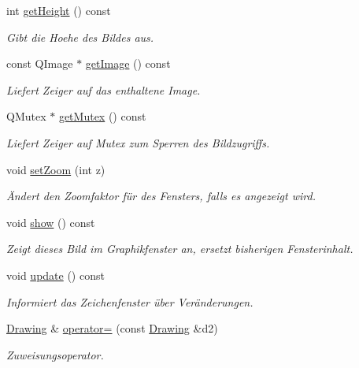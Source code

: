 \begin{DoxyCompactItemize}
int \mbox{\hyperlink{classDrawing_a7bd4dcf4718cf46a73d11e63dc7bc876}{get\+Height}} () const
\begin{DoxyCompactList}\small\item\em Gibt die Hoehe des Bildes aus. \end{DoxyCompactList}\item 
const Q\+Image $\ast$ \mbox{\hyperlink{classDrawing_a8cdafb9ad4dfd4b54dc40ae753980177}{get\+Image}} () const
\begin{DoxyCompactList}\small\item\em Liefert Zeiger auf das enthaltene Image. \end{DoxyCompactList}\item 
Q\+Mutex $\ast$ \mbox{\hyperlink{classDrawing_ae3d1a4bb0a61a5bd64170abc154dd25c}{get\+Mutex}} () const
\begin{DoxyCompactList}\small\item\em Liefert Zeiger auf Mutex zum Sperren des Bildzugriffs. \end{DoxyCompactList}\item 
void \mbox{\hyperlink{classDrawing_a0f16d649365d717f01b141761d487cf4}{set\+Zoom}} (int z)
\begin{DoxyCompactList}\small\item\em Ändert den Zoomfaktor für des Fensters, falls es angezeigt wird. \end{DoxyCompactList}\item 
void \mbox{\hyperlink{classDrawing_afbc865383cc38520bd094c6ad7ac2df7}{show}} () const
\begin{DoxyCompactList}\small\item\em Zeigt dieses Bild im Graphikfenster an, ersetzt bisherigen Fensterinhalt. \end{DoxyCompactList}\item 
void \mbox{\hyperlink{classDrawing_a7c4c84c4956ff577d5032f0c4b2991bd}{update}} () const
\begin{DoxyCompactList}\small\item\em Informiert das Zeichenfenster über Veränderungen. \end{DoxyCompactList}\item 
\mbox{\hyperlink{classDrawing}{Drawing}} \& \mbox{\hyperlink{classDrawing_aef1c7b74a454594f18aebcc0a8c17b8c}{operator=}} (const \mbox{\hyperlink{classDrawing}{Drawing}} \&d2)
\begin{DoxyCompactList}\small\item\em Zuweisungsoperator. \end{DoxyCompactList}\item 

\end{DoxyCompactItemize}
